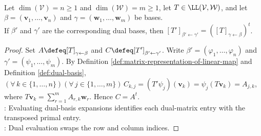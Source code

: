 \begin{theorem} \label{thm:matrix-of-dual-map-is-transpose} \\
Let $\dim(\mathcal{V})=n\geq1$ and $\dim(\mathcal{W})=m\geq1$, let $T\in\LL(\mathcal{V},\mathcal{W})$, and let $\beta=(\mathbf{v}_1,\ldots,\mathbf{v}_n)$ and $\gamma=(\mathbf{w}_1,\ldots,\mathbf{w}_m)$ be bases.\\
If $\beta'$ and $\gamma'$ are the corresponding dual bases, then $[T']_{\beta'\leftarrow\gamma'}=([T]_{\gamma\leftarrow\beta})^t$.
\begin{proof}
Set $A\defeq[T]_{\gamma\leftarrow\beta}$ and $C\defeq[T']_{\beta'\leftarrow\gamma'}$. Write $\beta'=(\varphi_1,\ldots,\varphi_n)$ and $\gamma'=(\psi_1,\ldots,\psi_m)$. By Definition \ref{def:matrix-representation-of-linear-map} and Definition \ref{def:dual-basis}, $(\forall\,k\in\{1,\ldots,n\})(\forall\,j\in\{1,\ldots,m\})\,C_{k,j}=(T'\psi_j)(\mathbf{v}_k)=\psi_j(T\mathbf{v}_k)=A_{j,k}$, where $T\mathbf{v}_k=\sum\limits_{r=1}^{m}A_{r,k}\mathbf{w}_r$. Hence $C=A^t$.\\
: Evaluating dual-basis expansions identifies each dual-matrix entry with the transposed primal entry.\\
: Dual evaluation swaps the row and column indices.
\end{proof}
\end{theorem}
